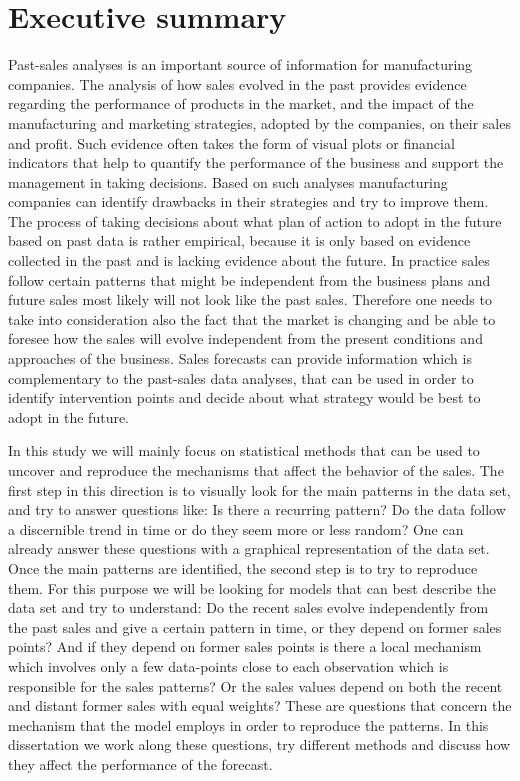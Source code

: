 \documentclass[12pt, letterpaper]{article}\usepackage[]{graphicx}\usepackage[]{color}
\begin{document}
\tableofcontents
\newpage
\section*{Executive summary}

Past-sales analyses is an important source of information for manufacturing companies. The analysis of how sales evolved in the past provides evidence regarding the performance of products in the market, and the impact of the manufacturing and marketing strategies, adopted by the companies, on their sales and profit. Such evidence often takes the form of visual plots or financial indicators that help to quantify the performance of the business and support the management in taking decisions. Based on such analyses manufacturing companies can identify drawbacks in their strategies and try to improve them. The process of taking decisions about what plan of action to adopt in the future based on past data is rather empirical, because it is only based on evidence collected in the past and is lacking evidence about the future. In practice sales follow certain patterns that might be independent from the business plans and future sales most likely will not look like the past sales. Therefore one needs to take into consideration also the fact that the market is changing and be able to foresee how the sales will evolve independent from the present conditions and approaches of the business. Sales forecasts can provide information which is complementary to the past-sales data analyses, that can be used in order to identify intervention points and decide about what strategy would be best to adopt in the future.

In this study we will mainly focus on statistical methods that can be used to uncover and reproduce the mechanisms that affect the behavior of the sales. The first step in this direction is to visually look for the main patterns in the data set, and try to answer questions like: Is there a recurring pattern? Do the data follow a discernible trend in time or do they seem more or less random? One can already answer these questions with a graphical representation of the data set. Once the main patterns are identified, the second step is to try to reproduce them. For this purpose we will be looking for models that can best describe the data set and try to understand: Do the recent sales evolve independently from the past sales and give a certain pattern in time, or they depend on former sales points? And if they depend on former sales points is there a local mechanism which involves only a few data-points close to each observation which is responsible for the sales patterns? Or the sales values depend on both the recent and distant former sales with equal weights? These are questions that concern the mechanism that the model employs in order to reproduce the patterns. In this dissertation we work along these questions, try different methods and discuss how they affect the performance of the forecast.
\end{document}
